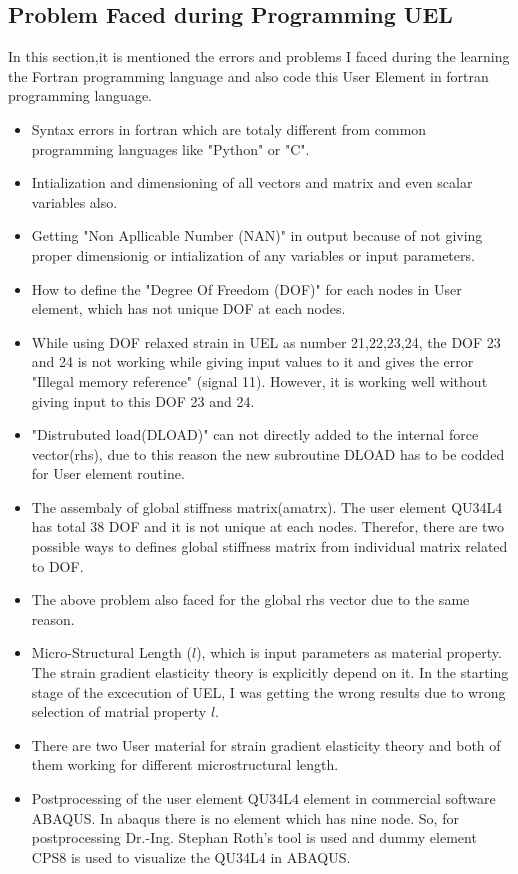 \documentclass[12pt]{article}
\begin{document}
\subsection{Problem Faced during Programming UEL}
In this section,it is mentioned the errors and problems I faced during the learning the Fortran programming language and also code this User Element in fortran programming language. 
\begin{itemize}
	\item Syntax errors in fortran which are totaly different from common programming languages like "Python" or "C".
	\item Intialization and dimensioning of all vectors and matrix and even scalar variables also. 
	\item Getting "Non Apllicable Number (NAN)" in output because of not giving proper dimensionig or intialization of any variables or input parameters.
	\item How to define the "Degree Of Freedom (DOF)" for each nodes in User element, which has not unique DOF at each nodes.
	\item While using DOF relaxed strain in UEL as number 21,22,23,24, the DOF 23 and 24 is not working while giving input values to it and gives the error "Illegal memory reference" (signal 11). However, it is working well without giving input to this DOF 23 and 24.
	\item "Distrubuted load(DLOAD)" can not directly added to the internal force vector(rhs), due to this reason the new subroutine DLOAD has to be codded for User element routine.
	\item The assembaly of global stiffness matrix(amatrx). The user element QU34L4 has total 38 DOF and it is not unique at each nodes. Therefor, there are two possible ways to defines global stiffness matrix from individual matrix related to DOF.
	\item The above problem also faced for the global rhs vector due to the same reason.
	\item Micro-Structural Length ($l$), which is input parameters as material property. The strain gradient elasticity theory is explicitly depend on it. In the starting stage of the excecution of UEL, I was getting the wrong results due to wrong selection of matrial property $l$.  
	\item There are two User material for strain gradient elasticity theory and both of them working for different microstructural length.
	\item Postprocessing of the user element QU34L4 element in commercial software ABAQUS. In abaqus there is no element which has nine node. So, for postprocessing Dr.-Ing. Stephan Roth's tool is used and dummy element CPS8 is used to visualize the QU34L4 in ABAQUS.
\end{itemize}
\end{document}
